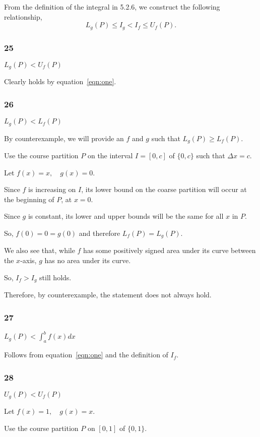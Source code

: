 \documentclass[../hw5.tex]{subfiles}
\begin{document}
From the definition of the integral in 5.2.6, we construct the following relationship,
\begin{equation}\label{eqn:one}
    L_g(P)\leq I_g < I_f \leq U_f(P).
\end{equation}

\subsubsection*{25}
$L_g(P)<U_f(P)$

Clearly holds by equation~\ref{eqn:one}.

\subsubsection*{26}
$L_g(P)<L_f(P)$

By counterexample, we will provide an $f$ and $g$ such that $L_g(P)\geq L_f(P)$.

Use the course partition $P$ on the interval $I=[0,c]$ of $\{0,c\}$ such that $\Delta x=c$.

Let $f(x)=x, \quad g(x)=0$.

Since $f$ is increasing on $I$, its lower bound on the coarse partition will occur at the beginning of $P$, at $x=0$.

Since $g$ is constant, its lower and upper bounds will be the same for all $x$ in $P$.

So, $f(0)=0=g(0)$ and therefore $L_f(P)=L_g(P)$.

We also see that, while $f$ has some positively signed area under its curve between the $x$-axis, $g$ has no area under its curve.

So, $I_f > I_g$ still holds.

Therefore, by counterexample, the statement does not always hold.

\subsubsection*{27}
$L_g(P)<\int_{a}^{b} f(x)dx$

Follows from equation~\ref{eqn:one} and the definition of $I_f$.

\subsubsection*{28}
$U_g (P) < U_f(P)$

Let $f(x)=1, \quad g(x)=x$.

Use the course partition $P$ on $[0,1]$ of $\{0,1\}$.
\end{document}
